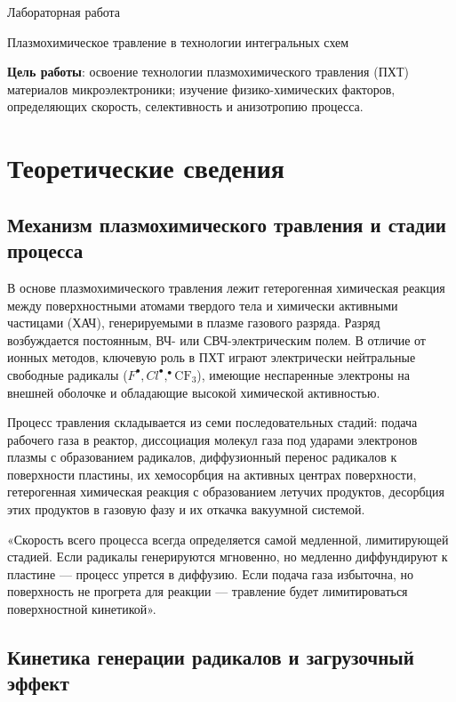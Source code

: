 \documentclass[12pt,a4paper]{article}
\theoremstyle{plain}
\theoremstyle{definition}
\theoremstyle{remark}
\numberwithin{equation}{section}
\begin{document}
\begin{center}
    \Large Лабораторная работа 
\end{center}

\begin{center}
    \large Плазмохимическое травление в технологии интегральных схем
\end{center}

\textbf{Цель работы}: освоение технологии плазмохимического травления (ПХТ) материалов микроэлектроники; изучение физико-химических факторов, определяющих скорость, селективность и анизотропию процесса.

\section{Теоретические сведения}

\subsection{Механизм плазмохимического травления и стадии процесса}

В основе плазмохимического травления лежит гетерогенная химическая реакция между поверхностными атомами твердого тела и химически активными частицами (ХАЧ), генерируемыми в плазме газового разряда. Разряд возбуждается постоянным, ВЧ- или СВЧ-электрическим полем. В отличие от ионных методов, ключевую роль в ПХТ играют электрически нейтральные свободные радикалы ($F^\bullet, Cl^\bullet, ^\bullet\mathrm{CF}_3$), имеющие неспаренные электроны на внешней оболочке и обладающие высокой химической активностью.

Процесс травления складывается из семи последовательных стадий: подача рабочего газа в реактор, диссоциация молекул газа под ударами электронов плазмы с образованием радикалов, диффузионный перенос радикалов к поверхности пластины, их хемосорбция на активных центрах поверхности, гетерогенная химическая реакция с образованием летучих продуктов, десорбция этих продуктов в газовую фазу и их откачка вакуумной системой.

«Скорость всего процесса всегда определяется самой медленной, лимитирующей стадией. Если радикалы генерируются мгновенно, но медленно диффундируют к пластине — процесс упрется в диффузию. Если подача газа избыточна, но поверхность не прогрета для реакции — травление будет лимитироваться поверхностной кинетикой».

\subsection{Кинетика генерации радикалов и загрузочный эффект}
\end{document}
